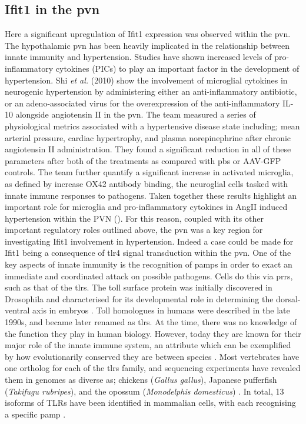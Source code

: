 \subsection{Ifit1 in the \acrfull{pvn}}

Here a significant upregulation of Ifit1 expression was observed within the \acrshort{pvn}. The hypothalamic \acrshort{pvn} has been heavily implicated in the relationship between innate immunity and hypertension. Studies have shown increased levels of pro-inflammatory cytokines (PICs) to play an important factor in the development of hypertension. Shi \textit{et al.} (2010) show the involvement of microglial cytokines in neurogenic hypertension by administering either an anti-inflammatory antibiotic, or an adeno-associated virus for the overexpression of the anti-inflammatory IL-10 alongside angiotensin II in the \acrshort{pvn}. The team measured a series of physiological metrics associated with a hypertensive disease state including; mean arterial pressure, cardiac hypertrophy, and plasma norepinephrine after chronic angiotensin II administration. They found a significant reduction in all of these parameters after both of the treatments as compared with \acrshort{pbs} or AAV-GFP controls. The team further quantify a significant increase in activated microglia, as defined by increase OX42 antibody binding, the neuroglial cells tasked with innate immune responses to pathogens. Taken together these results highlight an important role for microglia and pro-inflammatory cytokines in AngII induced hypertension within the PVN (\cite{Shi2010}). For this reason, coupled with its other important regulatory roles outlined above, the \acrshort{pvn} was a key region for investigating Ifit1 involvement in hypertension. 
Indeed a case could be made for Ifit1 being a consequence of \acrfull{tlr4} signal transduction within the \acrshort{pvn}. One of the key aspects of innate immunity is the recognition of \acrfull{pamp}s in order to exact an immediate and coordinated attack on possible pathogens. Cells do this via \acrfull{prrs}, such as that of the \acrfull{tlrs}. The toll surface protein was initially discovered in Drosophila and characterised for its developmental role in determining the dorsal-ventral axis in embryos \cite{GAY1991}. Toll homologues in humans were described in the late 1990s, and became later renamed as \acrfull{tlrs}. At the time, there was no knowledge of the function they play in human biology. However, today they are known for their major role of the innate immune system, an attribute which can be exemplified by how evolutionarily conserved they are between species \cite{ONeill2013}. Most vertebrates have one ortholog for each of the \acrshort{tlrs} family, and sequencing experiments have revealed them in genomes as diverse as; chickens (\textit{Gallus gallus}), Japanese pufferfish (\textit{Takifugu rubripes}), and the opossum (\textit{Monodelphis domesticus}) \cite{Roach2005}. In total, 13 isoforms of TLRs have been identified in mammalian cells, with each recognising a specific \acrshort{pamp} \cite{Dange2015}. 

